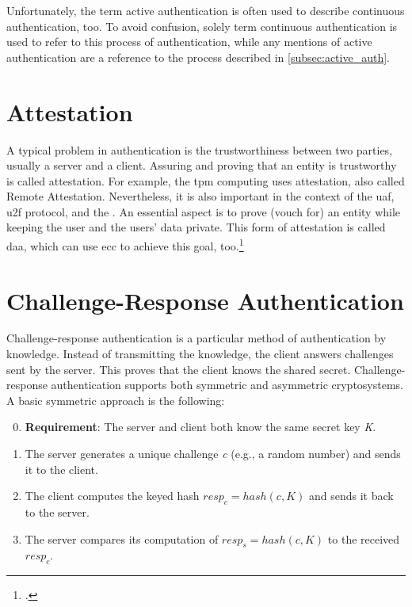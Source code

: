 Unfortunately, the term active authentication is often used to describe continuous authentication, too. To avoid confusion, solely term continuous authentication is used to refer to this process of authentication, while any mentions of active authentication are a reference to the process described in \autoref{subsec:active_auth}.

\section{Attestation}

A typical problem in authentication is the trustworthiness between two parties, usually a server and a client. Assuring and proving that an entity is trustworthy is called attestation. For example, the \gls{tpm} computing uses attestation, also called \frqq Remote Attestation\flqq. Nevertheless, it is also important in the context of the \gls{uaf}, \gls{u2f} protocol, and the \wa. An essential aspect is to prove (\frqq vouch for\flqq) an entity while keeping the user and the users' data private. This form of attestation is called \gls{daa}, which can use \gls{ecc} to achieve this goal, too.\footcites[See][]{trusted-comp}[See][501]{Mayes2017}[See][4]{Coker:2011:PRA:1989153.1989155}[See][100]{2178405}[See][226]{10.1007/978-3-642-12510-2_16}

\section{Challenge-Response Authentication}

Challenge-response authentication is a particular method of authentication by knowledge. Instead of transmitting the knowledge, the client answers challenges sent by the server. This proves that the client knows the shared secret. Challenge-response authentication supports both symmetric and asymmetric cryptosystems. A basic symmetric approach is the following:

\begin{enumerate}
	\setcounter{enumi}{-1} 
	\item \textbf{Requirement}: The server and client both know the same secret key \textit{K}.
	\item The server generates a unique challenge \textit{c} (e.g., a random number) and sends it to the client.
	\item The client computes the keyed hash \(resp_c = hash(c, K)\) and sends it back to the server.
	\item The server compares its computation of \(resp_s = hash(c, K)\) to the received \textit{\(resp_c\)}.
\end{enumerate}

